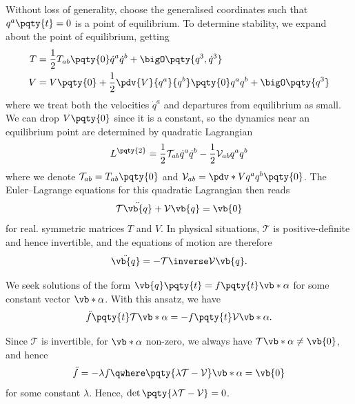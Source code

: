 Without loss of generality, choose the generalised coordinates such that \(q^a\pqty{t} = 0\) is a point of equilibrium. To determine stability, we expand about the point of equilibrium, getting
\begin{subequations}
    \begin{align}
        T &= \frac{1}{2} T_{ab} \pqty{0} \dot{q}^a \dot{q}^b + \bigO\pqty{q^3, \dot{q}^3} \\
        V &= V\pqty{0} + \frac{1}{2} \pdv{V}{q^a}{q^b} \pqty{0} q^a q^b + \bigO\pqty{q^3}
    \end{align}
\end{subequations}
where we treat both the velocities \(\dot{q}^a\) and departures from equilibrium as small. We can drop \(V\pqty{0}\) since it is a constant, so the dynamics near an equilibrium point are determined by quadratic Lagrangian
\begin{equation}
    L^{\pqty{2}} = \frac{1}{2} \mathcal{T}_{ab} \dot{q}^a \dot{q}^b - \frac{1}{2} \mathcal{V}_{ab} q^a q^b
\end{equation}
where we denote \(\mathcal{T}_{ab} = T_{ab}\pqty{0}\) and \(\mathcal{V}_{ab} = \pdv*{V}{q^a}{q^b}\pqty{0}\). The Euler--Lagrange equations for this quadratic Lagrangian then reads
\begin{equation}
    \mathcal{T} \ddot{\vb{q}} + \mathcal{V} \vb{q} = \vb{0}
\end{equation}
for real. symmetric matrices \(T\) and \(V\). In physical situations, \(\mathcal{T}\) is positive-definite and hence invertible, and the equations of motion are therefore
\begin{equation}
    \ddot{\vb{q}} = - \mathcal{T}\inverse \mathcal{V} \vb{q}.
\end{equation}

We seek solutions of the form \(\vb{q}\pqty{t} = f\pqty{t} \vb*{\alpha}\) for some constant vector \(\vb*{\alpha}\). With this ansatz, we have
\begin{equation}
    \ddot{f}\pqty{t} \mathcal{T} \vb*{\alpha} = - f\pqty{t} \mathcal{V} \vb*{\alpha}.
\end{equation}

Since \(\mathcal{T}\) is invertible, for \(\vb*{\alpha}\) non-zero, we always have \(\mathcal{T} \vb*{\alpha} \neq \vb{0}\), and hence
\begin{equation}
    \ddot{f} = - \lambda f \qwhere \pqty{\lambda \mathcal{T} - \mathcal{V}} \vb*{\alpha} = \vb{0}
\end{equation}
for some constant \(\lambda\). Hence, \(\det \pqty{\lambda \mathcal{T} - \mathcal{V}} = 0\).

